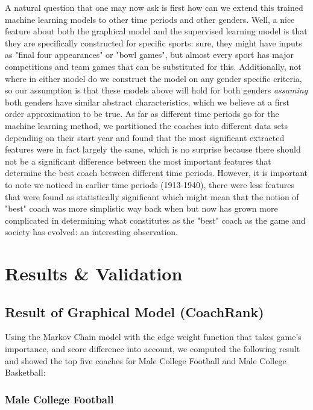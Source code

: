 \documentclass[titlepage,11pt]{article}
\begin{document}
\vspace{2 mm}

\noindent A natural question that one may now ask is first how can we extend this trained machine learning models to other time periods and other genders. Well, a nice feature about both the graphical model and the supervised learning model is that they are specifically constructed for specific sports: sure, they might have inputs as "final four appearances" or "bowl games", but almost every sport has major competitions and team games that can be substituted for this. Additionally, not where in either model do we construct the model on any gender specific criteria, so our assumption is that these models above will hold for both genders \textit{assuming} both genders have similar abstract characteristics, which we believe at a first order approximation to be true. As far as different time periods go for the machine learning method, we partitioned the coaches into different data sets depending on their start year and found that the most significant extracted features were in fact largely the same, which is no surprise because there should not be a significant difference between the most important features that determine the best coach between different time periods. However, it is important to note we noticed in earlier time periods (1913-1940), there were less features that were found as statistically significant which might mean that the notion of "best" coach was more simplistic way back when but now has grown more complicated in determining what constitutes as the "best" coach as the game and society has evolved: an interesting observation.    


\section{Results \& Validation}

\subsection{Result of Graphical Model (CoachRank)}

Using the Markov Chain model with the edge weight function that takes game's importance, and score difference into account, we computed the following result and showed the top five coaches for Male College Football and Male College Basketball:

\subsubsection*{Male College Football}
\end{document}
